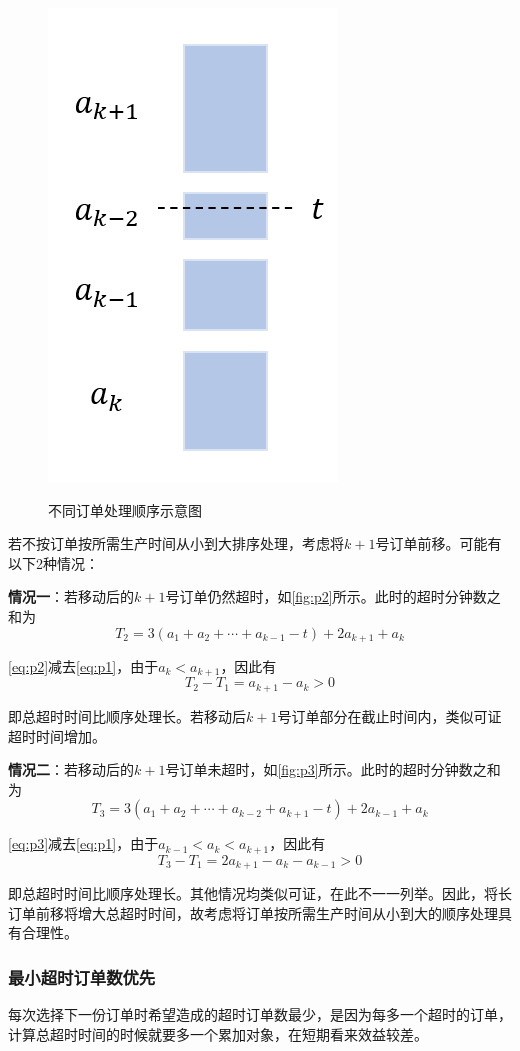 \begin{figure}[h]
\begin{minipage}[c]{0.3\textwidth}
        \label{fig:p2}
    \end{minipage} 
    \begin{minipage}[c]{0.3\textwidth}
        \centering
        \includegraphics[height=0.2\textheight]{pics/p3.png}
        \label{fig:p3}
    \end{minipage} 
  \caption{不同订单处理顺序示意图}
  \label{fig:pro1}
\end{figure}
      
      若不按订单按所需生产时间从小到大排序处理，考虑将$k+1$号订单前移。可能有以下2种情况：
      
      \textbf{情况一}：若移动后的$k+1$号订单仍然超时，如\cref{fig:p2}所示。此时的超时分钟数之和为
\begin{equation}
    \label{eq:p2} 
    T_2=3(a_1+a_2+\cdots+a_{k-1}-t)+2a_{k+1}+a_k
\end{equation}

\cref{eq:p2}减去\cref{eq:p1}，由于$a_k < a_{k+1}$，因此有
\[T_2-T_1=a_{k+1}-a_k>0\]

即总超时时间比顺序处理长。若移动后$k+1$号订单部分在截止时间内，类似可证超时时间增加。

\textbf{情况二}：若移动后的$k+1$号订单未超时，如\cref{fig:p3}所示。此时的超时分钟数之和为
\begin{equation}
    \label{eq:p3} 
    T_3=3(a_1+a_2+\cdots+a_{k-2}+a_{k+1}-t)+2a_{k-1}+a_k
\end{equation}

\cref{eq:p3}减去\cref{eq:p1}，由于$a_{k-1} < a_k < a_{k+1}$，因此有
\[T_3-T_1=2a_{k+1}-a_k-a_{k-1}>0\]

即总超时时间比顺序处理长。其他情况均类似可证，在此不一一列举。因此，将长订单前移将增大总超时时间，故考虑将订单按所需生产时间从小到大的顺序处理具有合理性。
      
      \subsubsection{最小超时订单数优先}
       每次选择下一份订单时希望造成的超时订单数最少，是因为每多一个超时的订单，计算总超时时间的时候就要多一个累加对象，在短期看来效益较差。